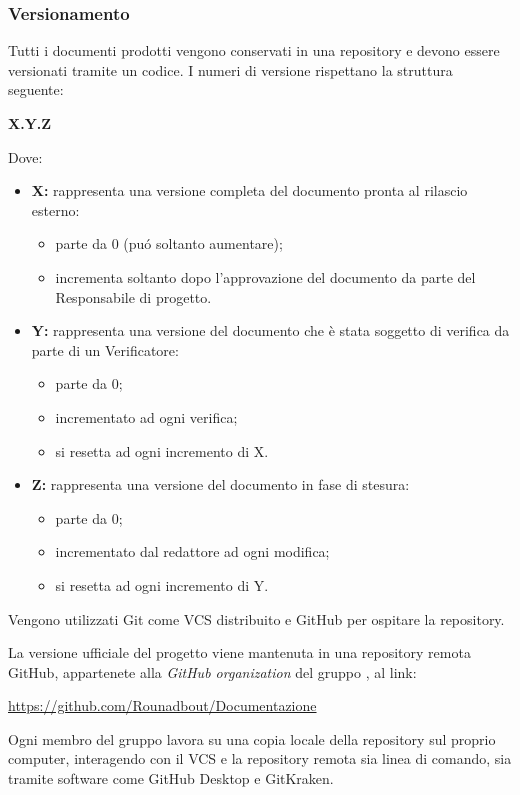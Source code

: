     \subsubsection{Versionamento}
        Tutti i documenti prodotti vengono conservati in una repository e devono essere versionati tramite un codice. I numeri di versione rispettano la struttura seguente:
        \begin{center}
          \textbf{X.Y.Z}
        \end{center}
        Dove:
        \begin{itemize}
          \item \textbf{X:} rappresenta una versione completa del documento pronta al rilascio esterno:
            \begin{itemize}
              \item parte da 0 (puó soltanto aumentare);
              \item incrementa soltanto dopo l'approvazione del documento da parte del Responsabile di progetto.
            \end{itemize}
          \item \textbf{Y:} rappresenta una versione del documento che è stata soggetto di verifica da parte di un Verificatore:
            \begin{itemize}
              \item parte da 0;
              \item incrementato ad ogni verifica;
              \item si resetta ad ogni incremento di X.
            \end{itemize}
          \item \textbf{Z:} rappresenta una versione del documento in fase di stesura:
            \begin{itemize}
              \item parte da 0;
              \item incrementato dal redattore ad ogni modifica;
              \item si resetta ad ogni incremento di Y.
            \end{itemize}
        \end{itemize}

        Vengono utilizzati Git come VCS distribuito e GitHub per ospitare la repository.

        La versione ufficiale del progetto viene mantenuta in una repository remota GitHub, appartenete alla \textit{GitHub organization} del gruppo \Gruppo{}, al link:
        \begin{center}
          \url{https://github.com/Rounadbout/Documentazione}
        \end{center}
        Ogni membro del gruppo lavora su una copia locale della repository sul proprio computer, interagendo con il VCS e la repository remota sia linea di comando, sia tramite software come GitHub Desktop e GitKraken.

